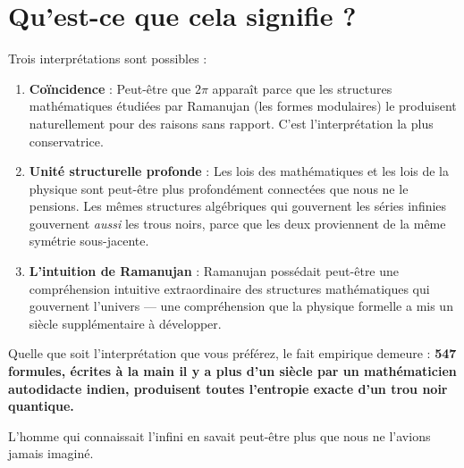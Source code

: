 \documentclass[11pt,a4paper]{article}
\begin{document}
\section{Qu'est-ce que cela signifie ?}

Trois interprétations sont possibles :

\begin{enumerate}[leftmargin=2em]
    \item \textbf{Coïncidence} : Peut-être que $2\pi$ apparaît parce que les structures mathématiques étudiées par Ramanujan (les formes modulaires) le produisent naturellement pour des raisons sans rapport. C'est l'interprétation la plus conservatrice.
    
    \item \textbf{Unité structurelle profonde} : Les lois des mathématiques et les lois de la physique sont peut-être plus profondément connectées que nous ne le pensions. Les mêmes structures algébriques qui gouvernent les séries infinies gouvernent \textit{aussi} les trous noirs, parce que les deux proviennent de la même symétrie sous-jacente.
    
    \item \textbf{L'intuition de Ramanujan} : Ramanujan possédait peut-être une compréhension intuitive extraordinaire des structures mathématiques qui gouvernent l'univers — une compréhension que la physique formelle a mis un siècle supplémentaire à développer.
\end{enumerate}

Quelle que soit l'interprétation que vous préférez, le fait empirique demeure : \textbf{547 formules, écrites à la main il y a plus d'un siècle par un mathématicien autodidacte indien, produisent toutes l'entropie exacte d'un trou noir quantique.}

L'homme qui connaissait l'infini en savait peut-être plus que nous ne l'avions jamais imaginé.

\end{document}
